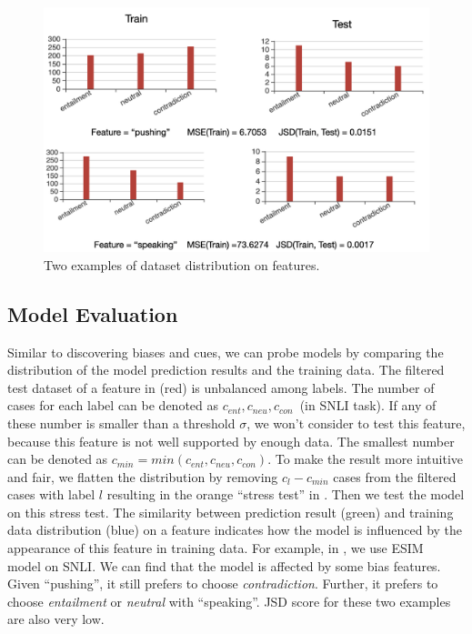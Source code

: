 \begin{figure}[th]
\centering
\includegraphics[width=1.0\columnwidth]{picture/dataset_result.jpg}
\caption{Two examples of dataset distribution on features.}
\label{fig:dataset_result}
\end{figure}

\subsection{Model Evaluation}
\label{sec:model}

Similar to discovering biases and cues, we can probe models by  
comparing the distribution of the model prediction results and 
the training data.
The filtered test dataset of a feature in  (red) is unbalanced among 
labels. The number of cases for each label can be denoted as $c_{ent}, c_{neu}, c_{con}$~(in 
SNLI task). If any of these number is smaller than a threshold $\sigma$, 
we won't consider to test this feature, because
 this feature is not well supported by enough data. 
The smallest number can be denoted as $c_{min}=min(c_{ent}, c_{neu}, c_{con})$.
To make the result more intuitive and fair, 
we flatten the distribution by removing $c_{l} - c_{min}$ cases from the filtered cases with label $l$ 
resulting in the orange ``stress test'' 
in . 
Then we test the model on this stress test. 
The similarity between prediction result (green) and 
training data distribution (blue) on a feature indicates how the model 
is influenced by the appearance of this feature in training data. 
For example, in , we use 
ESIM~\cite{chen2016enhanced} model on SNLI. 
We can find that the model is affected by some bias features. 
Given ``pushing'', it still prefers to choose \textit{contradiction}. 
Further, it prefers to choose \textit{entailment} or \textit{neutral} with ``speaking''.  
JSD score for these two examples are also very low. 

